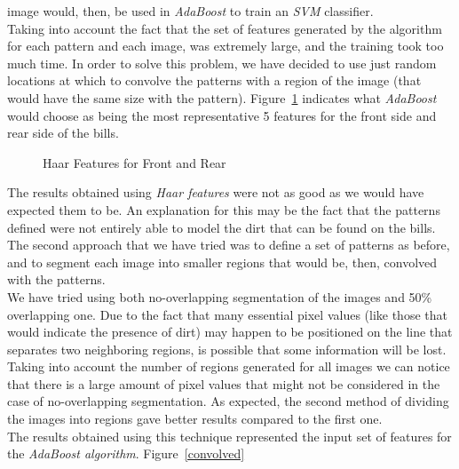 \documentclass[11pt,twocolumn]{article}
\begin{document}
			image would, then, be used in \emph{AdaBoost} to train an \emph{SVM}
			classifier.\\ 
			\hspace*{10px}Taking into account the fact that the set of features generated
			by the algorithm for each pattern and each image, was extremely large, and
			the training took too much time. In order to solve this problem, we have
			decided to use just random locations at which to convolve the patterns with a
			region of the image (that would have the same size with the pattern).
			Figure~\ref{Haar_features} indicates what \emph{AdaBoost} would choose as
			being the most representative 5 features for the front side and rear side of
			the bills.\\ 
			\begin{figure}[!hbtp]
				\centering
				\caption{Haar Features for Front and Rear}
				\label{Haar_features}
			\end{figure}
			\hspace*{10px}The results obtained using \emph{Haar features} were not as
			good as we would have expected them to be. An explanation for this may be the
			fact that the patterns defined were not entirely able to model the dirt that
			can be found on the bills.\\ 
			\hspace*{10px}The second approach that we have tried was to define a set of
			patterns as before, and to segment each image into smaller regions that would
			be, then, convolved with the patterns.\\ 
			\hspace*{10px}We have tried using both no-overlapping segmentation of the
			images and 50\% overlapping one. Due to the fact that many essential pixel
			values (like those that would indicate the presence of dirt) may happen to be
			positioned on the line that separates two neighboring regions, is possible
			that some information will be lost. Taking into account the number of regions
			generated for all images we can notice that there is a large amount of pixel
			values that might not be considered in the case of no-overlapping
			segmentation. As expected, the second method of dividing the images into
			regions gave better results compared to the first one.\\ 
			\hspace*{10px}The results obtained using this technique represented the input
			set of features for the \emph{AdaBoost algorithm}. Figure~\ref{convolved}
\end{document}
